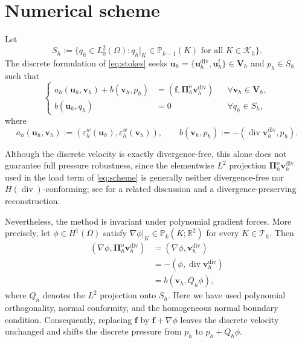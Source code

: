 \documentclass[review,hidelinks,onefignum,onetabnum]{siamart251216}
\begin{document}
\section{Numerical scheme}\label{sec:scheme}
Let
\[
S_h:=\{q_h\in L_0^2(\Omega):q_h|_K\in\mathbb P_{k-1}(K)
\text{ for all }K\in\mathcal K_h\}.
\]
The discrete formulation of \eqref{eq:stokes} seeks
$\boldsymbol u_h=\{\boldsymbol u_h^{\operatorname{div}},\boldsymbol u_h^t\}
\in\boldsymbol V_h$ and $p_h\in S_h$ such that
\begin{equation}\label{eq:scheme}
\left\{\begin{aligned}
a_h(\boldsymbol u_h,\boldsymbol v_h)+b(\boldsymbol v_h,p_h)
&=(\boldsymbol f,\boldsymbol\Pi_h^o\boldsymbol v_h^{\operatorname{div}})
&&\forall\boldsymbol v_h\in\boldsymbol V_h,\\
b(\boldsymbol u_h,q_h)&=0&&\forall q_h\in S_h,
\end{aligned}\right.
\end{equation}
where
\[
a_h(\boldsymbol u_h,\boldsymbol v_h):=
(\varepsilon_h^w(\boldsymbol u_h),\varepsilon_h^w(\boldsymbol v_h)),
\qquad
b(\boldsymbol v_h,p_h):=-(\operatorname{div}\boldsymbol v_h^{\operatorname{div}},p_h).
\]


\begin{remark}
\label{rem:pressure-gradient} Although the discrete velocity is
exactly divergence-free, this alone does not guarantee full
pressure robustness, since the elementwise $L^2$ projection
$\boldsymbol\Pi_h^o\boldsymbol v_h^{\operatorname{div}}$ used in
the load term of \eqref{eq:scheme} is generally neither
divergence-free nor $H(\operatorname{div})$-conforming; see
\cite{FrerichsMerdon2022} for a related discussion and a
divergence-preserving reconstruction.

Nevertheless, the method is invariant under polynomial gradient
forces. More precisely, let $\phi\in H^1(\Omega)$ satisfy
$\nabla\phi|_K\in\mathbb P_k(K;\mathbb R^2)$ for every
$K\in\mathcal T_h$. Then
\[
\begin{aligned}
(\nabla\phi,
 \boldsymbol\Pi_h^o\boldsymbol v_h^{\operatorname{div}})
&=(\nabla\phi,\boldsymbol v_h^{\operatorname{div}})\\
&=-(\phi,\operatorname{div}
          \boldsymbol v_h^{\operatorname{div}})\\
&=b(\boldsymbol v_h,Q_h\phi),
\end{aligned}
\]
where $Q_h$ denotes the $L^2$ projection onto $S_h$. Here we have
used polynomial orthogonality, normal conformity, and the
homogeneous normal boundary condition. Consequently, replacing
$\boldsymbol f$ by $\boldsymbol f+\nabla\phi$ leaves the discrete
velocity unchanged and shifts the discrete pressure from $p_h$ to
$p_h+Q_h\phi$.

\end{remark}
\end{document}

